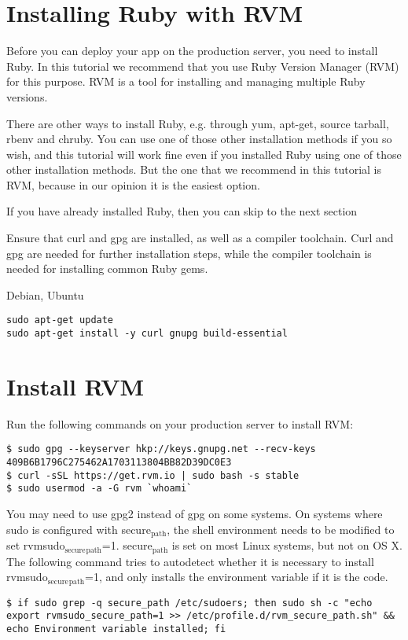\documentclass[11pt]{article}
\author{Justin}
\date{\today}
\title{}
\begin{document}
\tableofcontents

\section{Installing Ruby with RVM}
\label{sec:org2b46493}
Before you can deploy your app on the production server, you need to install Ruby. In this tutorial we recommend that you use Ruby Version Manager (RVM) for this purpose. RVM is a tool for installing and managing multiple Ruby versions.

There are other ways to install Ruby, e.g. through yum, apt-get, source tarball, rbenv and chruby. You can use one of those other installation methods if you so wish, and this tutorial will work fine even if you installed Ruby using one of those other installation methods. But the one that we recommend in this tutorial is RVM, because in our opinion it is the easiest option.

If you have already installed Ruby, then you can skip to the next section

Ensure that curl and gpg are installed, as well as a compiler toolchain. Curl and gpg are needed for further installation steps, while the compiler toolchain is needed for installing common Ruby gems.

Debian, Ubuntu	
\begin{verbatim}
sudo apt-get update
sudo apt-get install -y curl gnupg build-essential
\end{verbatim}
\section{Install RVM}
\label{sec:org5429236}

Run the following commands on your production server to install RVM:

\begin{verbatim}
$ sudo gpg --keyserver hkp://keys.gnupg.net --recv-keys 409B6B1796C275462A1703113804BB82D39DC0E3
$ curl -sSL https://get.rvm.io | sudo bash -s stable
$ sudo usermod -a -G rvm `whoami`
\end{verbatim}

You may need to use gpg2 instead of gpg on some systems.
On systems where sudo is configured with secure\(_{\text{path}}\), the shell environment needs to be modified to set rvmsudo\(_{\text{secure}}\)\(_{\text{path}}\)=1. secure\(_{\text{path}}\) is set on most Linux systems, but not on OS X. The following command tries to autodetect whether it is necessary to install rvmsudo\(_{\text{secure}}\)\(_{\text{path}}\)=1, and only installs the environment variable if it is the code.
\begin{verbatim}
$ if sudo grep -q secure_path /etc/sudoers; then sudo sh -c "echo export rvmsudo_secure_path=1 >> /etc/profile.d/rvm_secure_path.sh" && echo Environment variable installed; fi
\end{verbatim}
\end{document}
